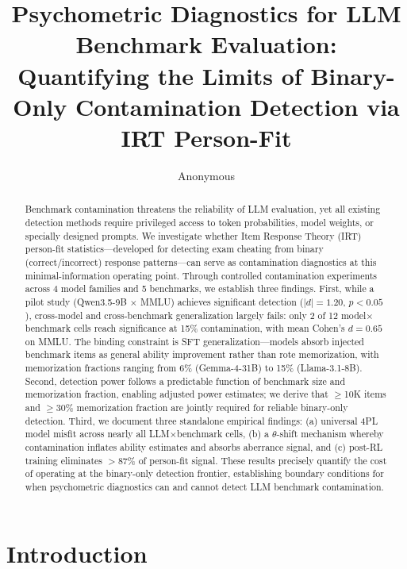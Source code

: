 \documentclass[11pt]{article}
\title{Psychometric Diagnostics for LLM Benchmark Evaluation:\\Quantifying the Limits of Binary-Only Contamination Detection via IRT Person-Fit}
\author{Anonymous}
\date{}
\begin{document}
\maketitle

\begin{abstract}
Benchmark contamination threatens the reliability of LLM evaluation, yet all existing detection methods require privileged access to token probabilities, model weights, or specially designed prompts. We investigate whether Item Response Theory (IRT) person-fit statistics---developed for detecting exam cheating from binary (correct/incorrect) response patterns---can serve as contamination diagnostics at this minimal-information operating point. Through controlled contamination experiments across 4 model families and 5 benchmarks, we establish three findings. First, while a pilot study (Qwen3.5-9B $\times$ MMLU) achieves significant detection ($|d|=1.20$, $p<0.05$), cross-model and cross-benchmark generalization largely fails: only 2 of 12 model$\times$benchmark cells reach significance at 15\% contamination, with mean Cohen's $d = 0.65$ on MMLU. The binding constraint is SFT generalization---models absorb injected benchmark items as general ability improvement rather than rote memorization, with memorization fractions ranging from 6\% (Gemma-4-31B) to 15\% (Llama-3.1-8B). Second, detection power follows a predictable function of benchmark size and memorization fraction, enabling adjusted power estimates; we derive that $\geq$10K items and $\geq$30\% memorization fraction are jointly required for reliable binary-only detection. Third, we document three standalone empirical findings: (a) universal 4PL model misfit across nearly all LLM$\times$benchmark cells, (b) a $\theta$-shift mechanism whereby contamination inflates ability estimates and absorbs aberrance signal, and (c) post-RL training eliminates $>$87\% of person-fit signal. These results precisely quantify the cost of operating at the binary-only detection frontier, establishing boundary conditions for when psychometric diagnostics can and cannot detect LLM benchmark contamination.
\end{abstract}

\section{Introduction}
\label{sec:intro}
\end{document}
